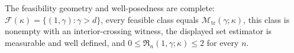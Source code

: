 The feasibility geometry and well-posedness are complete: \(\mathcal F(\kappa)=\{(1,\gamma):\gamma>d\}\), every feasible class equals \(\mathcal M_{\mathrm{tr}}(\gamma;\kappa)\), this class is nonempty with an interior-crossing witness, the displayed set estimator is measurable and well defined, and \(0\le\mathfrak R_n(1,\gamma;\kappa)\le2\) for every \(n\).